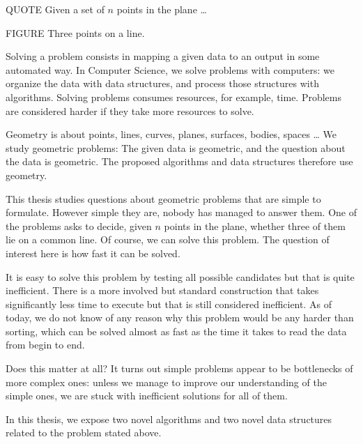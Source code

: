 


QUOTE Given a set of \(n\) points in the plane \dots

FIGURE Three points on a line.

Solving a problem consists in mapping a given data to an output in some
automated way.
In Computer Science, we solve problems with computers: we organize the data
with data structures, and process those structures with algorithms.
%
Solving problems consumes resources, for example, time.
Problems are considered harder if they take more resources to solve.

Geometry is about points, lines, curves, planes, surfaces, bodies, spaces \dots
We study geometric problems:
%
The given data is geometric, and the question about the data is geometric.
The proposed algorithms and data structures therefore use geometry.

This thesis studies questions about geometric problems that are simple to
formulate. However simple they are, nobody
has managed to answer them. One of the problems asks to decide, given \(n\) points in the plane,
whether three of them lie on a common line. Of course, we can solve this
problem. The question of interest here is how fast it can be solved.

It is easy to solve this problem by testing all possible candidates but that is
quite inefficient. There is a
more involved but standard construction that takes significantly less time to
execute but that is still considered inefficient. As of today, we do not know of
any reason why this problem would be any harder than sorting, which can be
solved almost as fast as the time it takes to read the data from begin to end.

Does this matter at all? It turns out simple problems appear to
be bottlenecks of more complex ones: unless we manage to improve our
understanding of the simple ones, we are stuck with inefficient solutions for
all of them.

In this thesis, we expose two novel algorithms and two novel data
structures related to the problem stated above.
